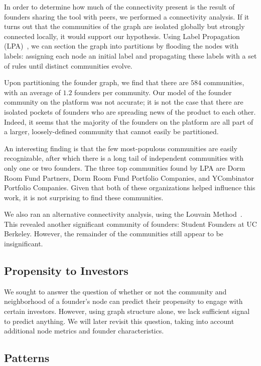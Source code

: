 In order to determine how much of the connectivity present is the result of founders sharing the tool with peers, we performed a connectivity analysis. If it turns out that the communities of the graph are isolated globally but strongly connected locally, it would support our hypothesis. Using Label Propagation (LPA)~\cite{2007PhRvE..76c6106R}, we can section the graph into partitions by flooding the nodes with labels: assigning each node an initial label and propagating these labels with a set of rules until distinct communities evolve.

Upon partitioning the founder graph, we find that there are $584$ communities, with an average of $1.2$ founders per community. Our model of the founder community on the platform was not accurate; it is not the case that there are isolated pockets of founders who are spreading news of the product to each other. Indeed, it seems that the majority of the founders on the platform are all part of a larger, loosely-defined community that cannot easily be partitioned.

An interesting finding is that the few most-populous communities are easily recognizable, after which there is a long tail of independent communities with only one or two founders. The three top communities found by LPA are Dorm Room Fund Partners, Dorm Room Fund Portfolio Companies, and YCombinator Portfolio Companies. Given that both of these organizations helped influence this work, it is not surprising to find these communities.

We also ran an alternative connectivity analysis, using the Louvain Method~\cite{2008JSMTE..10..008B}. This revealed another significant community of founders: Student Founders at UC Berkeley. However, the remainder of the communities still appear to be insignificant.

\subsection{Propensity to Investors}

We sought to answer the question of whether or not the community and neighborhood of a founder's node can predict their propensity to engage with certain investors. However, using graph structure alone, we lack sufficient signal to predict anything. We will later revisit this question, taking into account additional node metrics and founder characteristics.

\subsection{Patterns}

